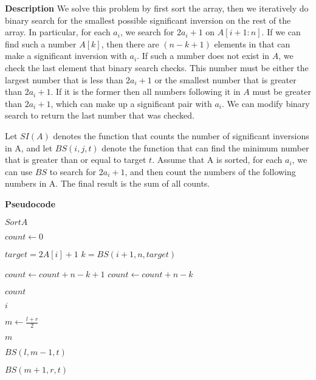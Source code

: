 \documentclass[12pt,article]{article}
\begin{document}
\textbf{Description}
We solve this problem by first sort the array, then we iteratively do binary search for the smallest possible significant inversion on the rest of the array. In particular, for each $a_i$, we search for $2a_i + 1$ on $A[i+1:n]$. If we can find such a number $A[k]$, then there are $(n-k+1)$ elements in that can make a significant inversion with $a_i$. If such a number does not exist in $A$, we check the last element that binary search checks. This number must be either the largest number that is less than $2a_i + 1$ or the smallest number that is greater than $2a_i + 1$. If it is the former then all numbers following it in $A$ must be greater than $2a_i + 1$, which can make up a significant pair with $a_i$. We can modify binary search to return the last number that was checked.

Let $SI(A)$ denotes the function that counts the number of significant inversions in A, and let $BS(i,j,t)$ denote the function that can find the minimum number that is greater than or equal to target $t$. Assume that A is sorted, for each $a_i$, we can use $BS$ to search for $2a_i + 1$, and then count the numbers of the following numbers in A. The final result is the sum of all counts.

\textbf{Pseudocode}

\begin{algorithm}
\caption{$CSI(A[1,n])$}\label{alg:q2-csi}
\begin{algorithmic}
    \State $Sort A$
    
    \State $count \gets 0$

        \State $target = 2A[i] + 1$
        \State $k = BS(i+1,n,target)$

            \State $count \gets count + n - k + 1$
        \Else
            \State $count \gets count + n - k$
        \EndIf
    \EndFor
    
    \Return $count$
\end{algorithmic}
\end{algorithm}

\begin{algorithm}
\caption{$BS(l,r,t)$}\label{alg:q2-mbs}
\begin{algorithmic}
        \Return $i$
    \EndIf

    \State $m \gets \frac{l+r}{2}$

        
        \Return $m$
        
        \Return $BS(l,m-1,t)$
    \Else  
        
        \Return $BS(m+1,r,t)$
    \EndIf
\end{algorithmic}
\end{algorithm}
\end{document}
